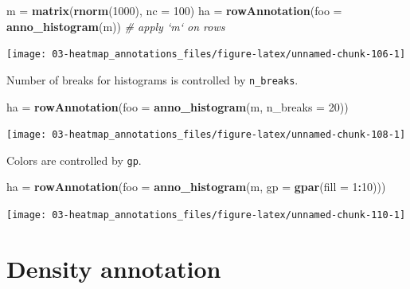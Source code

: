 \documentclass[]{book}
\newenvironment{Shaded}{\begin{snugshade}}{\end{snugshade}}
\newcommand{\KeywordTok}[1]{\textcolor[rgb]{0.13,0.29,0.53}{\textbf{#1}}}
\newcommand{\DataTypeTok}[1]{\textcolor[rgb]{0.13,0.29,0.53}{#1}}
\newcommand{\DecValTok}[1]{\textcolor[rgb]{0.00,0.00,0.81}{#1}}
\newcommand{\StringTok}[1]{\textcolor[rgb]{0.31,0.60,0.02}{#1}}
\newcommand{\CommentTok}[1]{\textcolor[rgb]{0.56,0.35,0.01}{\textit{#1}}}
\newcommand{\OperatorTok}[1]{\textcolor[rgb]{0.81,0.36,0.00}{\textbf{#1}}}
\newcommand{\NormalTok}[1]{#1}
\theoremstyle{definition}
\theoremstyle{definition}
\theoremstyle{definition}
\theoremstyle{remark}
\begin{document}
\begin{Shaded}
\begin{Highlighting}[]
\NormalTok{m =}\StringTok{ }\KeywordTok{matrix}\NormalTok{(}\KeywordTok{rnorm}\NormalTok{(}\DecValTok{1000}\NormalTok{), }\DataTypeTok{nc =} \DecValTok{100}\NormalTok{)}
\NormalTok{ha =}\StringTok{ }\KeywordTok{rowAnnotation}\NormalTok{(}\DataTypeTok{foo =} \KeywordTok{anno_histogram}\NormalTok{(m)) }\CommentTok{# apply `m` on rows}
\end{Highlighting}
\end{Shaded}

\begin{center}\texttt{[image: 03-heatmap\_annotations\_files/figure-latex/unnamed-chunk-106-1]} \end{center}

Number of breaks for histograms is controlled by \texttt{n\_breaks}.

\begin{Shaded}
\begin{Highlighting}[]
\NormalTok{ha =}\StringTok{ }\KeywordTok{rowAnnotation}\NormalTok{(}\DataTypeTok{foo =} \KeywordTok{anno_histogram}\NormalTok{(m, }\DataTypeTok{n_breaks =} \DecValTok{20}\NormalTok{))}
\end{Highlighting}
\end{Shaded}

\begin{center}\texttt{[image: 03-heatmap\_annotations\_files/figure-latex/unnamed-chunk-108-1]} \end{center}

Colors are controlled by \texttt{gp}.

\begin{Shaded}
\begin{Highlighting}[]
\NormalTok{ha =}\StringTok{ }\KeywordTok{rowAnnotation}\NormalTok{(}\DataTypeTok{foo =} \KeywordTok{anno_histogram}\NormalTok{(m, }\DataTypeTok{gp =} \KeywordTok{gpar}\NormalTok{(}\DataTypeTok{fill =} \DecValTok{1}\OperatorTok{:}\DecValTok{10}\NormalTok{)))}
\end{Highlighting}
\end{Shaded}

\begin{center}\texttt{[image: 03-heatmap\_annotations\_files/figure-latex/unnamed-chunk-110-1]} \end{center}

\section{Density annotation}\label{density-annotation}
\end{document}
